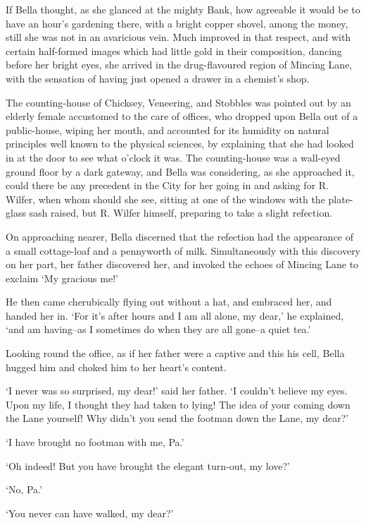 If Bella thought, as she glanced at the mighty Bank, how agreeable it
would be to have an hour’s gardening there, with a bright copper shovel,
among the money, still she was not in an avaricious vein. Much improved
in that respect, and with certain half-formed images which had little
gold in their composition, dancing before her bright eyes, she arrived
in the drug-flavoured region of Mincing Lane, with the sensation of
having just opened a drawer in a chemist’s shop.

The counting-house of Chicksey, Veneering, and Stobbles was pointed out
by an elderly female accustomed to the care of offices, who dropped upon
Bella out of a public-house, wiping her mouth, and accounted for its
humidity on natural principles well known to the physical sciences, by
explaining that she had looked in at the door to see what o’clock it
was. The counting-house was a wall-eyed ground floor by a dark gateway,
and Bella was considering, as she approached it, could there be any
precedent in the City for her going in and asking for R. Wilfer, when
whom should she see, sitting at one of the windows with the plate-glass
sash raised, but R. Wilfer himself, preparing to take a slight
refection.

On approaching nearer, Bella discerned that the refection had
the appearance of a small cottage-loaf and a pennyworth of milk.
Simultaneously with this discovery on her part, her father discovered
her, and invoked the echoes of Mincing Lane to exclaim ‘My gracious me!’

He then came cherubically flying out without a hat, and embraced her,
and handed her in. ‘For it’s after hours and I am all alone, my dear,’
he explained, ‘and am having--as I sometimes do when they are all
gone--a quiet tea.’

Looking round the office, as if her father were a captive and this his
cell, Bella hugged him and choked him to her heart’s content.

‘I never was so surprised, my dear!’ said her father. ‘I couldn’t
believe my eyes. Upon my life, I thought they had taken to lying! The
idea of your coming down the Lane yourself! Why didn’t you send the
footman down the Lane, my dear?’

‘I have brought no footman with me, Pa.’

‘Oh indeed! But you have brought the elegant turn-out, my love?’

‘No, Pa.’

‘You never can have walked, my dear?’

